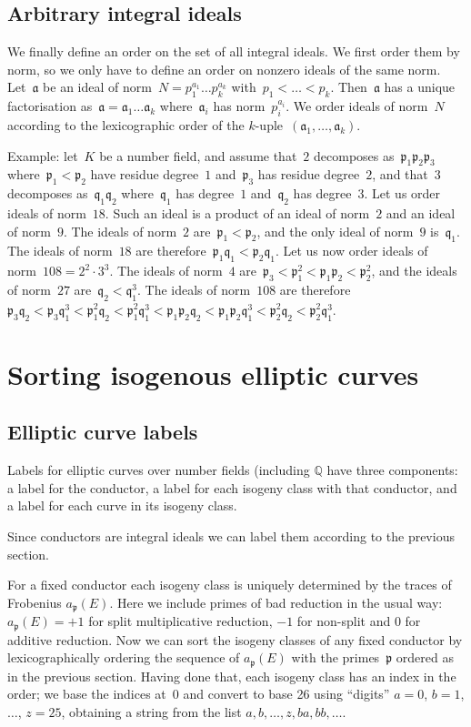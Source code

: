 \documentclass{article}
\def\Q{{\mathbb Q}}
\def\a{{\mathfrak a}}
\def\p{{\mathfrak p}}
\def\q{{\mathfrak q}}
\begin{document}
\subsection{Arbitrary integral ideals}

We finally define an order on the set of all integral ideals. We first order
them by norm, so we only have to define an order on nonzero ideals of the same
norm. Let~$\a$ be an ideal of norm~$N = p_1^{a_1}\dots p_k^{a_k}$ with~$p_1 <
\dots < p_k$. Then~$\a$ has a unique factorisation as~$\a = \a_1\dots\a_k$
where~$\a_i$ has norm~$p_i^{a_i}$. We order ideals of norm~$N$ according to the
lexicographic order of the $k$-uple~$(\a_1,\dots,\a_k)$.

Example: let~$K$ be a number field, and assume that~$2$ decomposes
as~$\p_1\p_2\p_3$ where~$\p_1<\p_2$ have residue degree~$1$ and~$\p_3$ has
residue degree~$2$, and that~$3$ decomposes as~$\q_1\q_2$ where~$\q_1$ has
degree~$1$ and~$\q_2$ has degree~$3$. Let us order ideals of norm~$18$. Such an
ideal is a product of an ideal of norm~$2$ and an ideal of norm~$9$. The ideals
of norm~$2$ are~$\p_1 < \p_2$, and the only ideal of norm~$9$ is~$\q_1$. The
ideals of norm~$18$ are therefore~$\p_1\q_1 < \p_2\q_1$. Let us now order ideals
of norm~$108 = 2^2\cdot 3^3$. The ideals of norm~$4$ are~$\p_3 < \p_1^2 < \p_1\p_2 <
\p_2^2$, and the ideals of norm~$27$ are~$\q_2 < \q_1^3$. The ideals of
norm~$108$ are therefore~$\p_3\q_2 < \p_3\q_1^3 < \p_1^2\q_2 < \p_1^2\q_1^3 <
\p_1\p_2\q_2 < \p_1\p_2\q_1^3 < \p_2^2\q_2 < \p_2^2\q_1^3$.

\section{Sorting isogenous elliptic curves}

\subsection{Elliptic curve labels}

Labels for elliptic curves over number fields (including $\Q$ have
three components: a label for the conductor, a label for each isogeny
class with that conductor, and a label for each curve in its isogeny
class.

Since conductors are integral ideals we can label them according to
the previous section.

For a fixed conductor each isogeny class is uniquely determined by the
traces of Frobenius $a_{\p}(E)$.  Here we include primes of bad
reduction in the usual way: $a_{\p}(E)=+1$ for split multiplicative
reduction, $-1$ for non-split and $0$ for additive reduction.  Now we
can sort the isogeny classes of any fixed conductor by
lexicographically ordering the sequence of $a_{\p}(E)$ with the
primes~$\p$ ordered as in the previous section.  Having done that,
each isogeny class has an index in the order; we base the indices
at~$0$ and convert to base 26 using ``digits'' $a=0$, $b=1$, $\dots$,
$z=25$, obtaining a string from the list $a, b, \dots, z, ba, bb,
\dots$.
\end{document}
